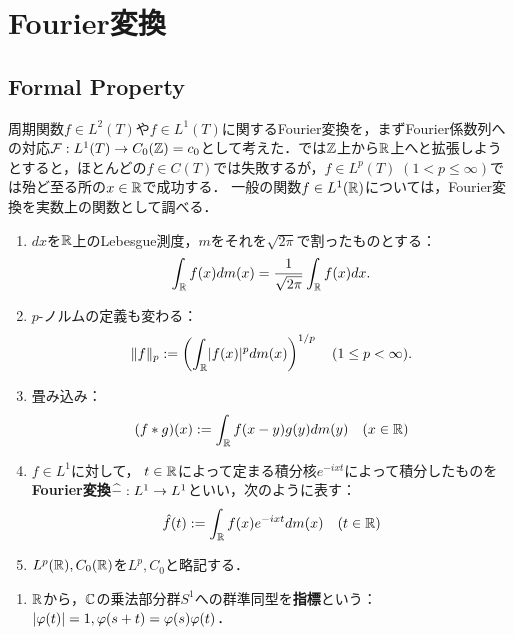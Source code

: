 \documentclass[uplatex,dvipdfmx]{jsreport}
\begin{document}
\chapter{Fourier変換}

\begin{quotation}
    
\end{quotation}

\section{Formal Property}

\begin{tcolorbox}[colframe=ForestGreen, colback=ForestGreen!10!white,breakable,colbacktitle=ForestGreen!40!white,coltitle=black,fonttitle=\bfseries\sffamily,
title=]
    周期関数$f\in L^2(T)$や$f\in L^1(T)$に関するFourier変換を，まずFourier係数列への対応$\mathcal{F}:L^1(T)\to C_0(\mathbb{Z})=c_0$として考えた．では$\mathbb{Z}$上から$\mathbb{R}$上へと拡張しようとすると，ほとんどの$f\in C(T)$では失敗するが，$f\in L^p(T)\;(1<p\le\infty)$では殆ど至る所の$x\in\mathbb{R}$で成功する．
    一般の関数$f\in L^1(\mathbb{R})$については，Fourier変換を実数上の関数として調べる．
\end{tcolorbox}

\begin{notation}\mbox{}
    \begin{enumerate}
        \item $dx$を$\mathbb{R}$上のLebesgue測度，$m$をそれを$\sqrt{2\pi}$で割ったものとする：
        \[\int_{\mathbb{R}} f(x)dm(x)=\frac{1}{\sqrt{2\pi}}\int_{\mathbb{R}} f(x)dx.\]
        \item $p$-ノルムの定義も変わる：
        \[\|f\|_p:=\left(\int_{\mathbb{R}}\lvert f(x)\rvert^pdm(x)\right)^{1/p}\quad(1\le p<\infty).\]
        \item 畳み込み：
        \[(f*g)(x):=\int_{\mathbb{R}} f(x-y)g(y)dm(y)\quad(x\in\mathbb{R})\]
        \item $f\in L^1$に対して，
        $t\in\mathbb{R}$によって定まる積分核$e^{-ixt}$によって積分したものを\textbf{Fourier変換}$\widehat{-}:L^1\to L^1$といい，次のように表す：
        \[\hat{f}(t):=\int_{\mathbb{R}} f(x)e^{-ixt}dm(x)\quad(t\in\mathbb{R})\]
        \item $L^p(\mathbb{R}),C_0(\mathbb{R})$を$L^p,C_0$と略記する．
    \end{enumerate}
\end{notation}

\begin{definition}\mbox{}
    \begin{enumerate}
        \item $\mathbb{R}$から，$\mathbb{C}$の乗法部分群$S^1$への群準同型を\textbf{指標}という：$\lvert\varphi(t)\rvert=1,\varphi(s+t)=\varphi(s)\varphi(t)$．
    \end{enumerate}
\end{definition}
\end{document}
